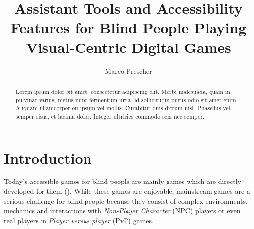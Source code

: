 \documentclass[sigconf,natbib=false,10pt]{acmart}
\begin{document}
	
	\title{Assistant Tools and Accessibility Features for Blind People Playing Visual-Centric Digital Games}
	
	\author{Marco Prescher}
	
	\renewcommand{\shortauthors}{Marco Prescher}
	
	\begin{abstract}
		Lorem ipsum dolor sit amet, consectetur adipiscing elit. Morbi
		malesuada, quam in pulvinar varius, metus nunc fermentum urna, id
		sollicitudin purus odio sit amet enim. Aliquam ullamcorper eu ipsum
		vel mollis. Curabitur quis dictum nisl. Phasellus vel semper risus, et
		lacinia dolor. Integer ultricies commodo sem nec semper.
	\end{abstract}
	
	
	
	
	\maketitle
	
	\section{Introduction} \label{sec:introduction}
	Today's accessible games for blind people are mainly games which are directly developed for them (\textcite{goncalves_my_2023}).
	While these games are enjoyable, mainstream games are a serious challenge for blind people because they consist of complex environments, mechanics and interactions with \emph{Non-Player Character} (NPC) players or even real players in \emph{Player versus player} (PvP) games.
	
\end{document}
